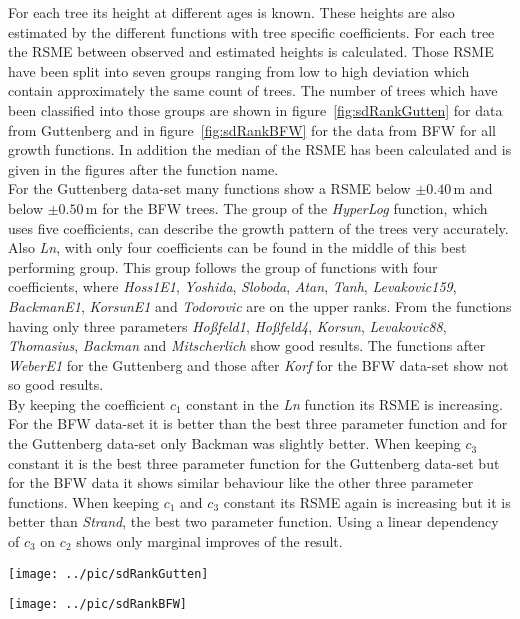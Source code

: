 \documentclass[a4paper,twocolumn]{article}
\begin{document}
For each tree its height at different ages is known. These heights
are also estimated by the different functions with tree specific
coefficients. For each tree the RSME between observed
and estimated heights is calculated. Those RSME have
been split into seven groups ranging from low to high deviation which
contain approximately the same count of trees. The number of trees
which have been classified into those groups are shown in
figure~\ref{fig:sdRankGutten} for data from Guttenberg and in
figure~\ref{fig:sdRankBFW} for the data from BFW for all growth
functions. In addition the median of the RSME has been
calculated and is given in the figures after the function name.\\
%
For the Guttenberg data-set many functions show a RSME
below $\pm 0.40$\,m and below $\pm 0.50$\,m for the BFW trees.
The group of the \emph{HyperLog} function, which uses five
coefficients, can describe the growth pattern of the trees very
accurately. Also \emph{Ln}, with only four coefficients can be found in
the middle of this best performing group. This group follows the group of
functions with four coefficients, where \emph{Hoss1E1},
\emph{Yoshida}, \emph{Sloboda}, \emph{Atan}, \emph{Tanh},
\emph{Levakovic159}, \emph{BackmanE1}, \emph{KorsunE1} and
\emph{Todorovic} are on the upper ranks. From the functions having
only three parameters \emph{Ho{\ss}feld1}, \emph{Ho{\ss}feld4}, \emph{Korsun},
\emph{Levakovic88}, \emph{Thomasius}, \emph{Backman} and
\emph{Mitscherlich} show
good results. The functions after \emph{WeberE1} for the Guttenberg
and those after \emph{Korf} for the BFW data-set show not so good
results.\\
%
By keeping the coefficient $c_1$ constant in the \emph{Ln} function
its RSME is increasing. For the BFW data-set it is better than the
best three parameter function and for the Guttenberg data-set only
Backman was slightly better. When keeping $c_3$ constant it is the
best three parameter function for the Guttenberg data-set but for the
BFW data it shows similar behaviour like the other three parameter
functions. When keeping $c_1$ and $c_3$ constant its RSME again is
increasing but it is better than \emph{Strand}, the best two parameter
function. Using a linear dependency of $c_3$ on $c_2$ shows only
marginal improves of the result.

\begin{figure*}[htbp]
  \begin{minipage}{.49\linewidth}
    \centering
    \texttt{[image: ../pic/sdRankGutten]}
    \caption{Distribution of the root--mean--square error for single trees in meter for the data from Guttenberg.}
    \label{fig:sdRankGutten}
\end{minipage}
  \begin{minipage}{.49\linewidth}
    \centering
    \texttt{[image: ../pic/sdRankBFW]}
    \caption{Distribution of the root--mean--square error single trees in meter for the data from BFW.}
    \label{fig:sdRankBFW}
  \end{minipage}
\end{figure*}
\end{document}
